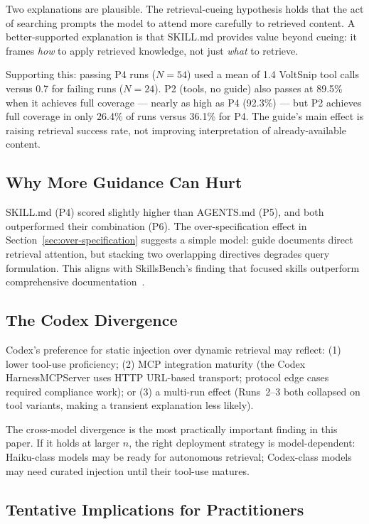 \documentclass[10pt,conference]{IEEEtran}
\begin{document}
Two explanations are plausible.
The retrieval-cueing hypothesis holds that the act of searching prompts the model to attend more carefully to retrieved content.
A better-supported explanation is that SKILL.md provides value beyond cueing: it frames \emph{how} to apply retrieved knowledge, not just \emph{what} to retrieve.

Supporting this: passing P4 runs ($N{=}54$) used a mean of 1.4 VoltSnip tool calls versus 0.7 for failing runs ($N{=}24$).
P2 (tools, no guide) also passes at 89.5\% when it achieves full coverage --- nearly as high as P4 (92.3\%) --- but P2 achieves full coverage in only 26.4\% of runs versus 36.1\% for P4.
The guide's main effect is raising retrieval success rate, not improving interpretation of already-available content.

\subsection{Why More Guidance Can Hurt}
\label{sec:guide-effects}

SKILL.md (P4) scored slightly higher than AGENTS.md (P5), and both outperformed their combination (P6).
The over-specification effect in Section~\ref{sec:over-specification} suggests a simple model: guide documents direct retrieval attention, but stacking two overlapping directives degrades query formulation.
This aligns with SkillsBench's finding that focused skills outperform comprehensive documentation~\cite{li2026skillsbench}.

\subsection{The Codex Divergence}
\label{sec:codex-divergence}

Codex's preference for static injection over dynamic retrieval may reflect: (1) lower tool-use proficiency; (2) MCP integration maturity (the Codex HarnessMCPServer uses HTTP URL-based transport; protocol edge cases required compliance work); or (3) a multi-run effect (Runs~2--3 both collapsed on tool variants, making a transient explanation less likely).

The cross-model divergence is the most practically important finding in this paper.
If it holds at larger $n$, the right deployment strategy is model-dependent: Haiku-class models may be ready for autonomous retrieval; Codex-class models may need curated injection until their tool-use matures.

\subsection{Tentative Implications for Practitioners}
\label{sec:implications}
\end{document}
